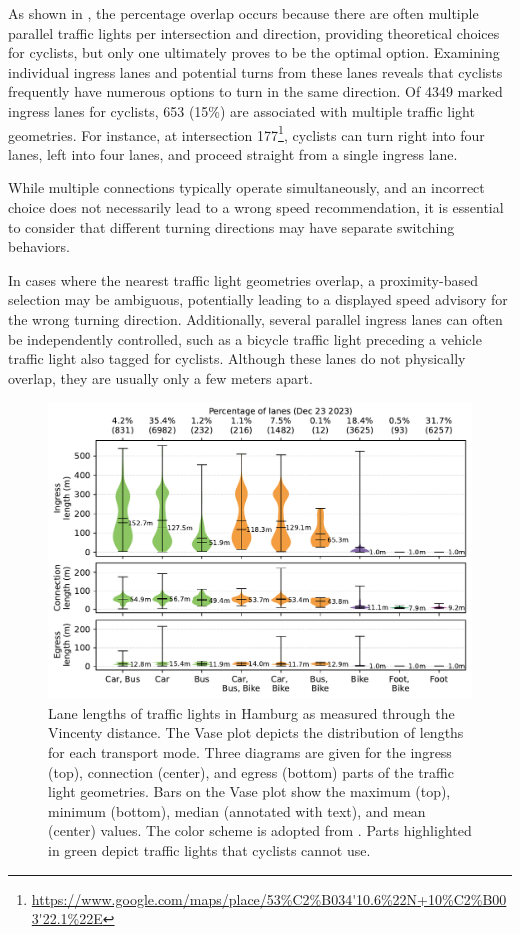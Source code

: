 As shown in , the percentage overlap occurs because there are often multiple parallel traffic lights per intersection and direction, providing theoretical choices for cyclists, but only one ultimately proves to be the optimal option. Examining individual ingress lanes and potential turns from these lanes reveals that cyclists frequently have numerous options to turn in the same direction. Of 4349 marked ingress lanes for cyclists, 653 (15\%) are associated with multiple traffic light geometries. For instance, at intersection 177\footnote{\url{https://www.google.com/maps/place/53\%C2\%B034'10.6\%22N+10\%C2\%B003'22.1\%22E}}, cyclists can turn right into four lanes, left into four lanes, and proceed straight from a single ingress lane.

While multiple connections typically operate simultaneously, and an incorrect choice does not necessarily lead to a wrong speed recommendation, it is essential to consider that different turning directions may have separate switching behaviors.

In cases where the nearest traffic light geometries overlap, a proximity-based selection may be ambiguous, potentially leading to a displayed speed advisory for the wrong turning direction. Additionally, several parallel ingress lanes can often be independently controlled, such as a bicycle traffic light preceding a vehicle traffic light also tagged for cyclists. Although these lanes do not physically overlap, they are usually only a few meters apart.

\begin{figure}[t]
\centering
\includegraphics[width=\linewidth]{images/lanes-lengths.pdf}
\caption{Lane lengths of traffic lights in Hamburg as measured through the Vincenty distance. The Vase plot depicts the distribution of lengths for each transport mode. Three diagrams are given for the ingress (top), connection (center), and egress (bottom) parts of the traffic light geometries. Bars on the Vase plot show the maximum (top), minimum (bottom), median (annotated with text), and mean (center) values. The color scheme is adopted from . Parts highlighted in green depict traffic lights that cyclists cannot use.}
\label{fig:ingress-lane-lengths}
\end{figure}

